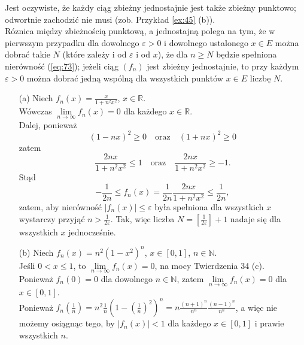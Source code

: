 \documentclass[leqno]{article}
\begin{document}
\begin{justify}
\begin{uwaga}
    Jest oczywiste, że każdy ciąg zbieżny jednostajnie jest także zbieżny punktowo;
    odwortnie zachodzić nie musi (zob. Przykład \ref{ex:45} (b)). \\
    Róznica między zbieżnością punktową, a jednostajną polega na tym, że w pierwszym
    przypadku dla dowolnego $\varepsilon > 0$ i dowolnego ustalonego $x \in E$ można dobrać
    takie $N$ (które zależy i od $\varepsilon$ i od $x$), że dla $n \geqslant N$ będzie
    spełniona nierówność (\ref{eq:73}); jeżeli ciąg $(f_n)$ jest zbieżny jednostajnie, to
    przy każdym $\varepsilon > 0$ można dobrać jedną wspólną dla wszystkich punktów $x \in
    E$ liczbę $N$.
\end{uwaga}

\newpage 

\begin{ex}
    \begin{itemize}
        \item [(a)] 
            Niech $f_n(x) = \frac{x}{1+n^2x^2}$, $x \in \mathbb{R}$. \\
            Wówczas $\lim\limits_{n \to \infty}f_n(x) = 0$ dla każdego $x \in \mathbb{R}$. \\
            Dalej, ponieważ
            \[
                {(1-nx)}^2 \geqslant 0 \quad \text{oraz} \quad {(1 + nx)}^2 \geqslant 0
            \]
            zatem
            \[
                \frac{2nx}{1+n^2x^2}\leqslant 1 \quad \text{oraz} \quad \frac{2nx}{1+n^2x^2} \geqslant -1.
            \]
            Stąd
            \[
                -\frac{1}{2n} \leqslant f_n(x) = \frac{1}{2n}\frac{2nx}{1+n^2x^2} \leqslant \frac{1}{2n},
            \]
            zatem, aby nierówność $|f_n(x)| \leqslant \varepsilon$ była spełniona dla
            wszystkich $x$ wystarczy przyjąć $n > \frac{1}{2\varepsilon}$. Tak, więc liczba
            $N = [\frac{1}{2\varepsilon}] + 1$ nadaje się dla wszystkich $x$ jednocześnie.
        \item [(b)]
            Niech $f_n(x) = n^2{(1-x^2)}^n$, $x \in [0,1]$, $n \in \mathbb{N}$. \\
            Jeśli $0 < x \leqslant 1$, to $\lim\limits_{n \to \infty} f_n(x) = 0$, na mocy Twierdzenia 34 (c). \\
            Ponieważ $f_n(0) = 0$ dla dowolnego $n \in \mathbb{N}$, zatem $\lim\limits_{n \to \infty}f_n(x) = 0$ dla $x \in [0,1]$. \\
            Ponieważ $f_n(\frac{1}{n})=n^2\frac{1}{n}{(1-(\frac{1}{n})^2)}^n = n\frac{{(n+1)}^n}{n^n}\frac{{(n-1)}^n}{n^n}$, a więc nie możemy osiągnąc tego, by
            $|f_n(x)| < 1$ dla każdego $x \in [0,1]$ i prawie wszystkich $n$. 
        \end{itemize}
\end{ex}


\end{justify}
\end{document}
